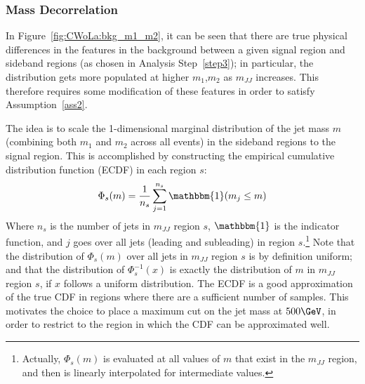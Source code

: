 \clearpage
\subsubsection{Mass Decorrelation}
\label{sec:CWoLa:decorrelation}
In Figure~\ref{fig:CWoLa:bkg_m1_m2}, it can be seen that there are true physical differences in the features in the background between a given signal region and sideband regions (as chosen in Analysis Step~\ref{step3}); in particular, the distribution gets more populated at higher $m_1$,$m_2$ as $m_{JJ}$ increases.
This therefore requires some modification of these features in order to satisfy Assumption~\ref{ass2}.

The idea is to scale the 1-dimensional marginal distribution of the jet mass $m$ (combining both $m_1$ and $m_2$ across all events) in the sideband regions to the signal region.
This is accomplished by constructing the empirical cumulative distribution function (ECDF) in each region $s$:
\begin{align}
  \Phi_s(m) = \frac{1}{n_s} \sum_{j=1}^{n_s} \mathbbm{1}(m_j\le m)
\end{align}
Where $n_s$ is the number of jets in $m_{JJ}$ region $s$, $\mathbbm{1}$ is the indicator function, and $j$ goes over all jets (leading and subleading) in region $s$.\footnote{Actually, $\Phi_s(m)$ is evaluated at all values of $m$ that exist in the $m_{JJ}$ region, and then is linearly interpolated for intermediate values.}
Note that the distribution of $\Phi_s(m)$ over all jets in $m_{JJ}$ region $s$ is by definition uniform; and that the distribution of $\Phi^{-1}_s(x)$ is exactly the distribution of $m$ in $m_{JJ}$ region $s$, if $x$ follows a uniform distribution.
The ECDF is a good approximation of the true CDF in regions where there are a sufficient number of samples.
This motivates the choice to place a maximum cut on the jet mass at $500 \GeV$, in order to restrict to the region in which the CDF can be approximated well.

